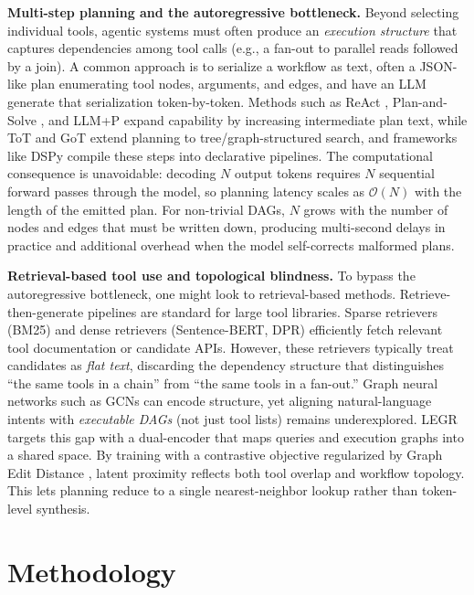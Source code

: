 \documentclass{article}
\begin{document}
\textbf{Multi-step planning and the autoregressive bottleneck.}
Beyond selecting individual tools, agentic systems must often produce an \emph{execution structure} that captures dependencies among tool calls (e.g., a fan-out to parallel reads followed by a join).
A common approach is to serialize a workflow as text, often a JSON-like plan enumerating tool nodes, arguments, and edges, and have an LLM generate that serialization token-by-token.
Methods such as ReAct \cite{yao2023react}, Plan-and-Solve \cite{wang2023plan}, and LLM+P \cite{liu2023llmp} expand capability by increasing intermediate plan text, while ToT \cite{yao2023tree} and GoT \cite{besta2023graph} extend planning to tree/graph-structured search, and frameworks like DSPy \cite{khattab2023dspy} compile these steps into declarative pipelines.
The computational consequence is unavoidable: decoding $N$ output tokens requires $N$ sequential forward passes through the model, so planning latency scales as $\mathcal{O}(N)$ with the length of the emitted plan.
For non-trivial DAGs, $N$ grows with the number of nodes and edges that must be written down, producing multi-second delays in practice and additional overhead when the model self-corrects malformed plans.

\textbf{Retrieval-based tool use and topological blindness.}
To bypass the autoregressive bottleneck, one might look to retrieval-based methods. Retrieve-then-generate pipelines are standard for large tool libraries. Sparse retrievers (BM25) \cite{robertson2009probabilistic} and dense retrievers (Sentence-BERT, DPR) \cite{reimers-gurevych-2019-sentence,karpukhin2020dense} efficiently fetch relevant tool documentation or candidate APIs.
However, these retrievers typically treat candidates as \emph{flat text}, discarding the dependency structure that distinguishes ``the same tools in a chain'' from ``the same tools in a fan-out.''
Graph neural networks such as GCNs \cite{kipf2017semi} can encode structure, yet aligning natural-language intents with \emph{executable DAGs} (not just tool lists) remains underexplored.
LEGR targets this gap with a dual-encoder that maps queries and execution graphs into a shared space. By training with a contrastive objective regularized by Graph Edit Distance \cite{sanfeliu1983distance}, latent proximity reflects both tool overlap and workflow topology. This lets planning reduce to a single nearest-neighbor lookup rather than token-level synthesis.

\section{Methodology}
\end{document}
